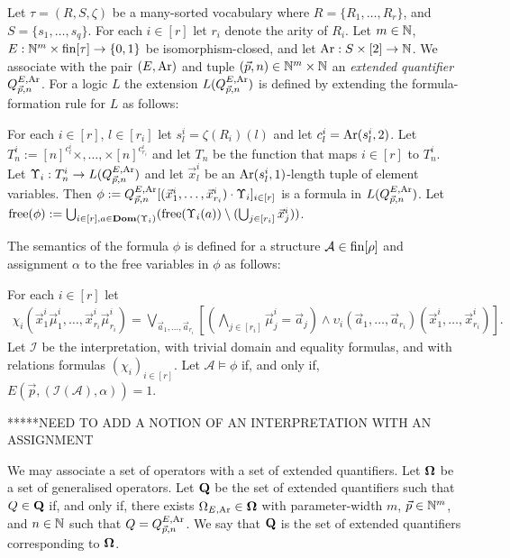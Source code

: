 \documentclass[../main/thesis.tex]{subfiles}
\begin{document}
Let $\tau = (R, S, \zeta)$ be a many-sorted vocabulary where $R = \{R_1, \ldots,
R_{r}\}$, and $S = \{s_1, \ldots, s_{q}\}$. For each $i \in [r]$ let $r_i$
denote the arity of $R_i$. Let $m \in \mathbb{N}$, $E : \mathbb{N}^{m} \times \text{\upshape fin}[\tau]
\rightarrow \{0,1\}$ be isomorphism-closed, and let $\text{\upshape Ar} : S \times [2] \rightarrow \mathbb{N}$. We
associate with the pair $(E, \text{\upshape Ar})$ and tuple $(\vec{p}, n) \in \mathbb{N}^{m} \times
\mathbb{N}$ an \emph{extended quantifier} $Q^{E, \text{\upshape Ar}}_{\vec{p},n}$. For a logic $L$
the extension $L(Q^{E, \text{\upshape Ar}}_{\vec{p},n})$ is defined by extending the
formula-formation rule for $L$ as follows:
\begin{textbox}[13.8cm]
  For each $i \in [r]$, $l \in [r_i]$ let $s^i_l = \zeta (R_i)(l)$ and let
  $c^i_l = \text{\upshape Ar}(s^i_l, 2)$. Let $T^i_n := [n]^{c^i_l} \times , \ldots, \times
  [n]^{c^i_{r_i}}$ and let $T_n$ be the function that maps $i \in [r]$ to
  $T^i_n$. Let $\Upsilon_i : T^i_n \rightarrow L(Q^{E, \text{\upshape Ar}}_{\vec{p}, n})$ and let
  $\vec{x}^i_l$ be an $\text{\upshape Ar}(s^i_l, 1)$-length tuple of element variables. Then
  $\phi := Q^{E, \text{\upshape Ar}}_{\vec{p}, n} [(\vec{x}^i_1, \ldots, \vec{x}^i_{r_i}) \cdot
  \Upsilon_i]_{i \in [r]}$ is a formula in $L(Q^{E, \text{\upshape Ar}}_{\vec{p}, n})$. Let
  $\mathrm{free}(\phi) := \bigcup_{i \in [r], a \in
    \text{\textbf{Dom}}(\Upsilon_i)}(\mathrm{free}(\Upsilon_i(a)) \setminus (\bigcup_{j \in
    [r_i]}\vec{x}^i_j))$.
\end{textbox}
The semantics of the formula $\phi$ is defined for a structure $\mathcal{A} \in
\text{\upshape fin}[\rho]$ and assignment $\alpha$ to the free variables in $\phi$ as follows:
\begin{textbox}[13.8cm]
  For each $i \in [r]$ let
  \begin{align*} \chi_i (\vec{x}^i_1 \vec{\mu}^i_1, \ldots, \vec{x}^i_{r_i}
    \vec{\mu}^i_{r_i}) = \bigvee_{\vec{a}_1, \ldots,
      \vec{a}_{r_i}}[(\bigwedge_{j \in [r_i]} \vec{\mu}^i_j= \vec{a}_j) \land
    \upsilon_i(\vec{a}_1, \ldots, \vec{a}_{r_i})(\vec{x}^i_1, \ldots,
    \vec{x}^i_{r_i})].
  \end{align*}
  Let $\mathcal{I}$ be the interpretation, with trivial domain and equality
  formulas, and with relations formulas $(\chi_i)_{i \in [r]}$. Let $\mathcal{A}
  \models \phi$ if, and only if, $E(\vec{p}, (\mathcal{I}(\mathcal{A}), \alpha))
  = 1$.
\end{textbox}

*****NEED TO ADD A NOTION OF AN INTERPRETATION WITH AN ASSIGNMENT

We may associate a set of operators with a set of extended quantifiers. Let
$\mathbf{\mathbf{\Omega}}$ be a set of generalised operators. Let $\mathbf{Q}$ be the set of
extended quantifiers such that $Q \in \mathbf{Q}$ if, and only if, there exists
$\Omega_{E, \text{\upshape Ar}} \in \mathbf{\mathbf{\Omega}}$ with parameter-width $m$, $\vec{p} \in \mathbb{N}^m$,
and $n \in \mathbb{N}$ such that $Q = Q^{E, \text{\upshape Ar}}_{\vec{p}, n}$. We say that
$\mathbf{Q}$ is the set of extended quantifiers corresponding to $\mathbf{\mathbf{\Omega}}$.
\end{document}
